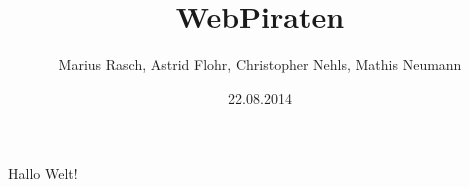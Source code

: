 \documentclass{beamer}
\begin{document}
\title{WebPiraten}  
\author{Marius Rasch, Astrid Flohr, Christopher Nehls, Mathis Neumann}
\date{22.08.2014} 

\begin{frame}
\maketitle
\end{frame} 

\begin{frame}
Hallo Welt!
\end{frame}
\end{document}
